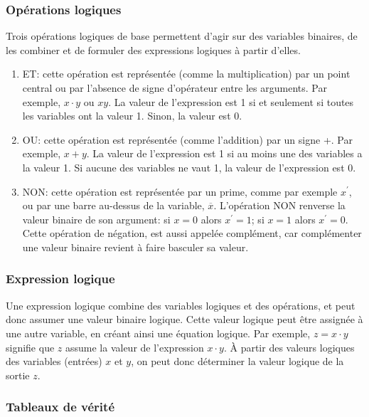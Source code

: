 \documentclass[11pt]{article}
\begin{document}
\subsubsection{Opérations logiques}
\label{sec:org24d8f9e}

Trois opérations logiques de base permettent d'agir sur des variables
binaires, de les combiner et de formuler des expressions logiques à
partir d'elles.

\begin{enumerate}
\item ET: cette opération est représentée (comme la multiplication) par
un point central ou par l'absence de signe d'opérateur entre les
arguments. Par exemple, \(x \cdot y\) ou \(x y\). La valeur de
l'expression est 1 si et seulement si toutes les variables ont la
valeur 1. Sinon, la valeur est 0.
\item OU: cette opération est représentée (comme l'addition) par un signe
+. Par exemple, \(x + y\). La valeur de l'expression est 1 si au
moins une des variables a la valeur 1. Si aucune des variables ne
vaut 1, la valeur de l'expression est 0.
\item NON: cette opération est représentée par un prime, comme par
exemple \(x^\prime\), ou par une barre au-dessus de la variable,
\(\overline{x}\).  L'opération NON renverse la valeur binaire de
son argument: si \(x =0\) alors \(x^ \prime = 1\); si \(x =1\)
alors \(x^ \prime = 0\). Cette opération de négation, est aussi
appelée complément, car complémenter une valeur binaire revient à
faire basculer sa valeur.
\end{enumerate}

\subsubsection{Expression logique}
\label{sec:org0088f90}

Une expression logique combine des variables logiques et des
opérations, et peut donc assumer une valeur binaire logique. Cette
valeur logique peut être assignée à une autre variable, en créant
ainsi une équation logique. Par exemple, \(z = x \cdot y\) signifie
que \(z\) assume la valeur de l'expression \(x \cdot y\). À partir des
valeurs logiques des variables (entrées) \(x\) et \(y\), on peut donc
déterminer la valeur logique de la sortie \(z\).

\subsubsection{Tableaux de vérité}
\label{sec:orgbb1fa18}
\end{document}
